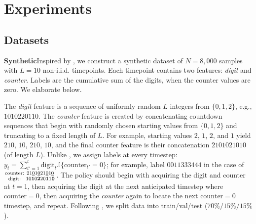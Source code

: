 \section{Experiments}
\label{sec:experiment}
\subsection{Datasets}
\textbf{Synthetic}\quad Inspired by \citet{kossen2022active}, we construct a synthetic dataset of $N=8,000$ samples with $L=10$ non-i.i.d. timepoints. Each timepoint contains two features: \textit{digit} and \textit{counter}. Labels are the cumulative sum of the digits, when the counter values are zero. We elaborate below.



The \textit{digit} feature is a sequence of uniformly random $L$ integers from $\{0, 1, 2\}$, e.g., $1010220110$. The \textit{counter} feature is created by concatenating countdown sequences that begin with randomly chosen starting values from $\{0, 1, 2\}$ and truncating to a fixed length of $L$. For example, starting values $2$, $1$, $2$, and $1$ yield $210$, $10$, $210$, $10$, and the final counter feature is their concatenation $2101021010$ (of length $L$). Unlike \citet{kossen2022active}, we assign labels at every timestep: 
$y_t=\sum_{t'=1}^{t}\mathrm{digit}_{t'}\mathbb{I}\{\mathrm{counter}_{t'}=0\}$; for example, label $0011333444$ in the case of $\genfrac{}{}{0pt}{}{\mathrm{counter:}}{\mathrm{digit:}}  
 \genfrac{}{}{0pt}{}{21\underline{0}1\underline{0}21\underline{0}1\underline{0}}{10\mathbf{1}0\mathbf{2}20\mathbf{1}1\mathbf{0}}$. The policy should begin with acquiring the digit and counter at 
$t=1$, then acquiring the digit at the next anticipated timestep where $\mathrm{counter}=0$, then acquiring the \textit{counter} again to locate the next $\mathrm{counter}=0$ timestep, and repeat. Following \citet{kossen2022active}, we split data into train/val/test ($70\%/15\%/15\%$).

